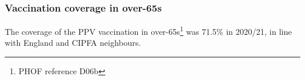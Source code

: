 
    


\subsubsection{Vaccination coverage in over-65s}
The coverage of the PPV vaccination in over-65s\footnote{PHOF reference D06b} was 71.5\% in 2020/21, in line with England and CIPFA neighbours.

